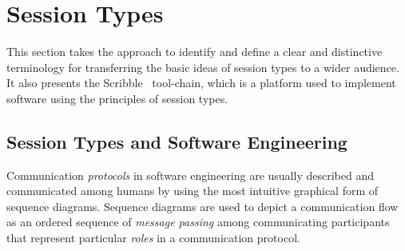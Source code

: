 
\section{Session Types}
\label{sec:session_types}


This section takes the approach to identify and define
a clear and distinctive terminology
for transferring the basic ideas of session types to a wider audience.
It also presents the Scribble~\cite{scribble} %
tool-chain, which is a platform used to implement
software using the principles of session types.

\subsection{Session Types and Software Engineering}%
\label{sec:sessions_software}



Communication \emph{protocols} in software engineering
are usually described and communicated among humans
by using the most intuitive graphical form of sequence diagrams.
Sequence diagrams are used to depict a communication flow as an ordered
sequence of \emph{message passing} among communicating
participants that represent particular \emph{roles} in a communication
protocol.

